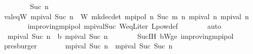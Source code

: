 \begin{isabellebody}
\ \ \isamarkupfalse%
\isanewline
\ \ \ \ \isamarkupfalse%
\ {\isacharparenleft}{\kern0pt}Suc\ n{\isacharparenright}{\kern0pt}\isanewline
\ \ \ \ \isamarkupfalse%
\ val{\isacharunderscore}{\kern0pt}eq{\isacharunderscore}{\kern0pt}W{\isacharcolon}{\kern0pt}\ {\isachardoublequoteopen}mpi{\isacharunderscore}{\kern0pt}val\ {\isacharparenleft}{\kern0pt}Suc\ n{\isacharparenright}{\kern0pt}\ {\isacharequal}{\kern0pt}\ W\ {\isacharparenleft}{\kern0pt}mk{\isacharunderscore}{\kern0pt}dec{\isacharunderscore}{\kern0pt}det\ {\isacharparenleft}{\kern0pt}mpi{\isacharunderscore}{\kern0pt}pol\ n{\isacharparenright}{\kern0pt}{\isacharparenright}{\kern0pt}\ {\isacharparenleft}{\kern0pt}Suc\ {\isacharparenleft}{\kern0pt}m\ n\ {\isacharparenleft}{\kern0pt}mpi{\isacharunderscore}{\kern0pt}val\ n{\isacharparenright}{\kern0pt}{\isacharparenright}{\kern0pt}{\isacharparenright}{\kern0pt}\ {\isacharparenleft}{\kern0pt}mpi{\isacharunderscore}{\kern0pt}val\ n{\isacharparenright}{\kern0pt}{\isachardoublequoteclose}\isanewline
\ \ \ \ \ \ \isamarkupfalse%
\ {\isasymnu}{\isacharunderscore}{\kern0pt}improving{\isacharunderscore}{\kern0pt}mpi{\isacharunderscore}{\kern0pt}pol\ mpi{\isacharunderscore}{\kern0pt}val{\isacharunderscore}{\kern0pt}Suc\ W{\isacharunderscore}{\kern0pt}eq{\isacharunderscore}{\kern0pt}L{\isacharunderscore}{\kern0pt}iter\ L{\isacharunderscore}{\kern0pt}pow{\isacharunderscore}{\kern0pt}def\isanewline
\ \ \ \ \ \ \isamarkupfalse%
\ auto\isanewline
\ \ \ \ \isamarkupfalse%
\ {\isacharasterisk}{\kern0pt}{\isacharcolon}{\kern0pt}\ {\isachardoublequoteopen}mpi{\isacharunderscore}{\kern0pt}val\ {\isacharparenleft}{\kern0pt}Suc\ n{\isacharparenright}{\kern0pt}\ {\isasymle}\ {\isasymL}\isactrlsub b\ {\isacharparenleft}{\kern0pt}mpi{\isacharunderscore}{\kern0pt}val\ {\isacharparenleft}{\kern0pt}Suc\ n{\isacharparenright}{\kern0pt}{\isacharparenright}{\kern0pt}{\isachardoublequoteclose}\isanewline
\ \ \ \ \ \ \isamarkupfalse%
\ Suc{\isachardot}{\kern0pt}IH\ {\isasymL}\isactrlsub b{\isacharunderscore}{\kern0pt}W{\isacharunderscore}{\kern0pt}ge\ {\isasymnu}{\isacharunderscore}{\kern0pt}improving{\isacharunderscore}{\kern0pt}mpi{\isacharunderscore}{\kern0pt}pol\ \isamarkupfalse%
\ presburger\isanewline
\ \ \ \ \isamarkupfalse%
\ \isamarkupfalse%
\ {\isachardoublequoteopen}mpi{\isacharunderscore}{\kern0pt}val\ {\isacharparenleft}{\kern0pt}Suc\ n{\isacharparenright}{\kern0pt}\ {\isasymle}\ mpi{\isacharunderscore}{\kern0pt}val\ {\isacharparenleft}{\kern0pt}Suc\ {\isacharparenleft}{\kern0pt}Suc\ n{\isacharparenright}{\kern0pt}{\isacharparenright}{\kern0pt}{\isachardoublequoteclose}\isanewline

\end{isabellebody}
